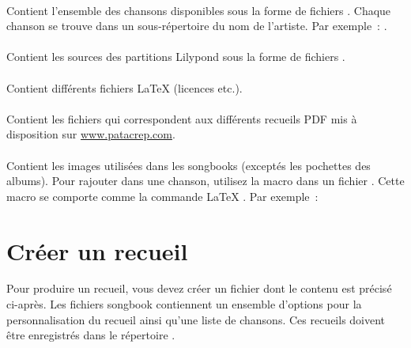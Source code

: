 \paragraph{}
Contient l'ensemble des chansons disponibles sous la forme de fichiers
. Chaque chanson se trouve dans un sous-répertoire du nom
de l'artiste. Par exemple~:
.

\paragraph{}
Contient les sources des partitions Lilypond sous la forme de fichiers
.

\paragraph{}
Contient différents fichiers \LaTeX{} (licences etc.).

\paragraph{}
Contient les fichiers  qui correspondent aux différents
recueils PDF mis à disposition sur \url{www.patacrep.com}.

\paragraph{}
Contient les images utilisées dans les songbooks (exceptés les
pochettes des albums). Pour rajouter  dans une
chanson, utilisez la macro  dans un fichier
. Cette macro se comporte comme la commande \LaTeX{}
. Par exemple~:

\begin{songbook}
\end{songbook}

\section{Créer un recueil}
\label{sec:create-songbook}

Pour produire un recueil, vous devez créer un fichier  dont le
contenu est précisé ci-après. Les fichiers songbook 
contiennent un ensemble d'options pour la personnalisation du recueil
ainsi qu'une liste de chansons. Ces recueils doivent être enregistrés
dans le répertoire .


